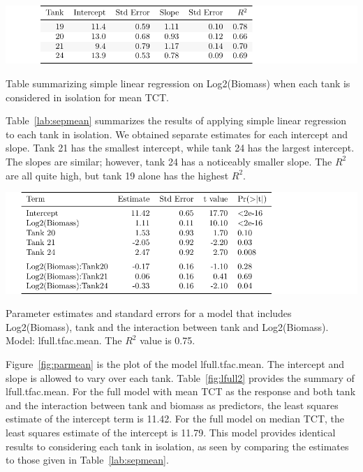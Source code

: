 \begin{table}[H]
\includegraphics{Chapter3Images/meantankspecific.pdf}
\caption{Table summarizing simple linear regression on Log2(Biomass) when each tank is considered in isolation for mean TCT.}
\label{lab:sepmean}
\end{table}


Table~\ref{lab:sepmean} summarizes the results of applying simple linear regression to each tank in isolation. We obtained separate estimates for each intercept and slope. Tank 21 has the smallest intercept, while tank 24 has the largest intercept. The slopes are similar; however, tank 24 has a noticeably smaller slope. The $R^{2}$ are all quite high, but tank 19 alone has the highest $R^{2}$.







\begin{table}[H]
\includegraphics{Chapter3Images/lmMean3.pdf}
\caption{ \hspace{1mm}Parameter estimates and standard errors for a model that includes Log2(Biomass), tank and the interaction between tank and Log2(Biomass). Model:  lfull.tfac.mean. The $R^{2}$ value is 0.75.}
\label{fig:lfull2}
\end{table}


Figure~\ref{fig:parmean} is the plot of the model  lfull.tfac.mean. The intercept and slope is allowed to vary over each tank. Table~\ref{fig:lfull2} provides the summary of  lfull.tfac.mean. For the full model with mean TCT as the response and  both tank and the interaction between tank and biomass as predictors, the least squares estimate of the intercept term is 11.42. For the full model on median TCT, the least squares estimate of the intercept is 11.79. This model provides identical results to considering each tank in isolation, as seen by comparing the estimates to those given in Table~\ref{lab:sepmean}.

